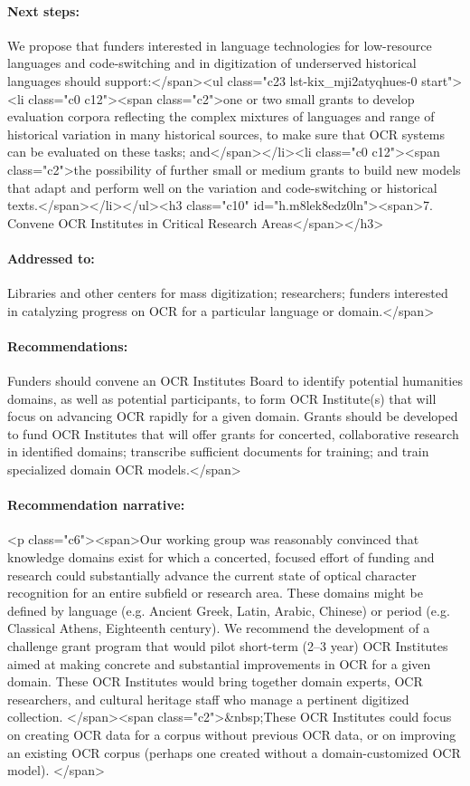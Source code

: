 \documentclass[twoside,11pt]{report}
\begin{document}
\paragraph{Next steps:} We propose that funders interested in language technologies for low-resource languages and code-switching and in digitization of underserved historical languages should support:</span><ul class="c23 lst-kix_mji2atyqhues-0 start"><li class="c0 c12"><span class="c2">one or two small grants to develop evaluation corpora reflecting the complex mixtures of languages and range of historical variation in many historical sources, to make sure that OCR systems can be evaluated on these tasks; and</span></li><li class="c0 c12"><span class="c2">the possibility of further small or medium grants to build new models that adapt and perform well on the variation and code-switching or historical texts.</span></li></ul><h3 class="c10" id="h.m8lek8edz0ln"><span>7. Convene OCR Institutes in Critical Research Areas</span></h3>

\paragraph{Addressed to:} Libraries and other centers for mass digitization; researchers; funders interested in catalyzing progress on OCR for a particular language or domain.</span>

\paragraph{Recommendations:} Funders should convene an OCR Institutes Board to identify potential humanities domains, as well as potential participants, to form OCR Institute(s) that will focus on advancing OCR rapidly for a given domain. Grants should be developed to fund OCR Institutes that will offer grants for concerted, collaborative research in identified domains; transcribe sufficient documents for training; and train specialized domain OCR models.</span>

\paragraph{Recommendation narrative:}

<p class="c6"><span>Our working group was reasonably convinced that knowledge domains exist for which a concerted, focused effort of funding and research could substantially advance the current state of optical character recognition for an entire subfield or research area. These domains might be defined by language (e.g. Ancient Greek, Latin, Arabic, Chinese) or period (e.g. Classical Athens, Eighteenth century). We recommend the development of a challenge grant program that would pilot short-term (2--3 year) OCR Institutes aimed at making concrete and substantial improvements in OCR for a given domain. These OCR Institutes would bring together domain experts, OCR researchers, and cultural heritage staff who manage a pertinent digitized collection. </span><span class="c2">&nbsp;These OCR Institutes could focus on creating OCR data for a corpus without previous OCR data, or on improving an existing OCR corpus (perhaps one created without a domain-customized OCR model). </span>
\end{document}

